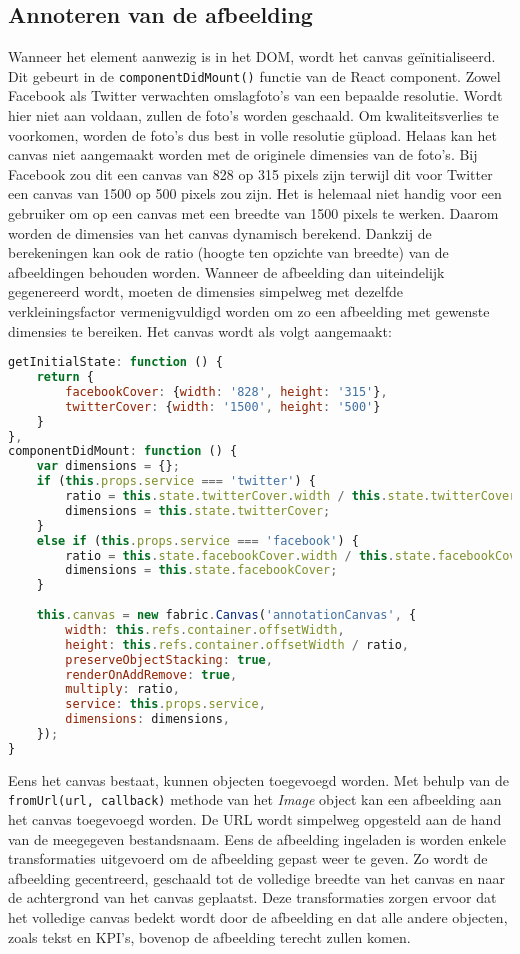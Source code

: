 \subsection{Annoteren van de afbeelding}\label{AnnoterenVanAfbeelding}
Wanneer het element aanwezig is in het DOM, wordt het canvas ge\"{i}nitialiseerd. Dit gebeurt in de \lstinline{componentDidMount()} functie van de React component. Zowel Facebook als Twitter verwachten omslagfoto's van een bepaalde resolutie. Wordt hier niet aan voldaan, zullen de foto's worden geschaald. Om kwaliteitsverlies te voorkomen, worden de foto's dus best in volle resolutie g\"{u}pload. Helaas kan het canvas niet aangemaakt worden met de originele dimensies van de foto's. Bij Facebook zou dit een canvas van 828 op 315 pixels zijn terwijl dit voor Twitter een canvas van 1500 op 500 pixels zou zijn. Het is helemaal niet handig voor een gebruiker om op een canvas met een breedte van 1500 pixels te werken. Daarom worden de dimensies van het canvas dynamisch berekend. Dankzij de berekeningen kan ook de ratio (hoogte ten opzichte van breedte) van de afbeeldingen behouden worden. Wanneer de afbeelding dan uiteindelijk gegenereerd wordt, moeten de dimensies simpelweg met dezelfde verkleiningsfactor vermenigvuldigd worden om zo een afbeelding met gewenste dimensies te bereiken. Het canvas wordt als volgt aangemaakt:

\begin{lstlisting}[language=javascript]
getInitialState: function () {
	return {
		facebookCover: {width: '828', height: '315'},
		twitterCover: {width: '1500', height: '500'}
	}
},
componentDidMount: function () {
	var dimensions = {};
	if (this.props.service === 'twitter') {
		ratio = this.state.twitterCover.width / this.state.twitterCover.height;
		dimensions = this.state.twitterCover;
	}
	else if (this.props.service === 'facebook') {
		ratio = this.state.facebookCover.width / this.state.facebookCover.height;
		dimensions = this.state.facebookCover;
	}
		
	this.canvas = new fabric.Canvas('annotationCanvas', {
		width: this.refs.container.offsetWidth,
		height: this.refs.container.offsetWidth / ratio,
		preserveObjectStacking: true,
		renderOnAddRemove: true,
		multiply: ratio,
		service: this.props.service,
		dimensions: dimensions,
	});
}
\end{lstlisting}

Eens het canvas bestaat, kunnen objecten toegevoegd worden. Met behulp van de \lstinline{fromUrl(url, callback)} methode van het \textit{Image} object kan een afbeelding aan het canvas toegevoegd worden. De URL wordt simpelweg opgesteld aan de hand van de meegegeven bestandsnaam. Eens de afbeelding ingeladen is worden enkele transformaties uitgevoerd om de afbeelding gepast weer te geven. Zo wordt de afbeelding gecentreerd, geschaald tot de volledige breedte van het canvas en naar de achtergrond van het canvas geplaatst. Deze transformaties zorgen ervoor dat het volledige canvas bedekt wordt door de afbeelding en dat alle andere objecten, zoals tekst en KPI's, bovenop de afbeelding terecht zullen komen. 



